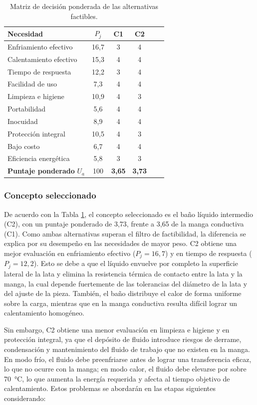 \documentclass[12pt, a4paper]{article}
\begin{document}
\begin{table}[H]
\centering
\small
\begin{tabular}{lccccc}
\toprule
\textbf{Necesidad} & $P_j$ & \textbf{C1} & \textbf{C2} \\
\midrule
Enfriamiento efectivo   & 16,7 & 3 & 4 \\
Calentamiento efectivo  & 15,3 & 4 & 4 \\
Tiempo de respuesta     & 12,2 & 3 & 4 \\
Facilidad de uso        & 7,3  & 4 & 4 \\
Limpieza e higiene      & 10,9 & 4 & 3 \\
Portabilidad            & 5,6  & 4 & 4 \\
Inocuidad               & 8,9  & 4 & 4 \\
Protección integral     & 10,5 & 4 & 3 \\
Bajo costo              & 6,7  & 4 & 4 \\
Eficiencia energética   & 5,8  & 3 & 3 \\
\midrule
\textbf{Puntaje ponderado} $U_a$ & 100 & \textbf{3,65} & \textbf{3,73} \\
\bottomrule
\end{tabular}
\caption{Matriz de decisión ponderada de las alternativas factibles.}
\label{tab:matriz_decision}
\end{table}

\subsubsection{Concepto seleccionado}
De acuerdo con la Tabla \ref{tab:matriz_decision}, el concepto seleccionado es el baño líquido intermedio (C2), con un puntaje ponderado de 3,73, frente a 3,65 de la manga conductiva (C1). Como ambas alternativas superan el filtro de factibilidad, la diferencia se explica por su desempeño en las necesidades de mayor peso. C2 obtiene una mejor evaluación en enfriamiento efectivo ($P_j = 16{,}7$) y en tiempo de respuesta ($P_j = 12{,}2$). Esto se debe a que el líquido envuelve por completo la superficie lateral de la lata y elimina la resistencia térmica de contacto entre la lata y la manga, la cual depende fuertemente de las tolerancias del diámetro de la lata y del ajuste de la pieza. También, el baño distribuye el calor de forma uniforme sobre la carga, mientras que en la manga conductiva resulta difícil lograr un calentamiento homogéneo.

Sin embargo, C2 obtiene una menor evaluación en limpieza e higiene y en protección integral, ya que el depósito de fluido introduce riesgos de derrame, condensación y mantenimiento del fluido de trabajo que no existen en la manga. En modo frío, el fluido debe preenfriarse antes de lograr una transferencia eficaz, lo que no ocurre con la manga; en modo calor, el fluido debe elevarse por sobre \SI{70}{\celsius}, lo que aumenta la energía requerida y afecta al tiempo objetivo de calentamiento. Estos problemas se abordarán en las etapas siguientes considerando:
\end{document}
